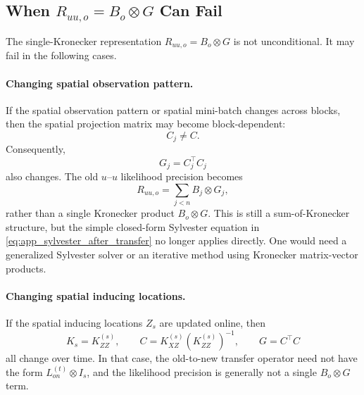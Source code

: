 \documentclass[12pt]{article}
\begin{document}
\subsection{\texorpdfstring{When \(R_{uu,o}=B_o\otimes G\) Can Fail}{When Ruu,o = Bo tensor G Can Fail}}
\label{app:failure_cases_Ro_kron}

The single-Kronecker representation \(R_{uu,o}=B_o\otimes G\) is not
unconditional. It may fail in the following cases.

\paragraph{Changing spatial observation pattern.}
If the spatial observation pattern or spatial mini-batch changes across
blocks, then the spatial projection matrix may become block-dependent:
\begin{equation}
    C_j\neq C.
\end{equation}
Consequently,
\begin{equation}
    G_j=C_j^\top C_j
\end{equation}
also changes. The old $u$--$u$ likelihood precision becomes
\begin{equation}
    R_{uu,o}
    =
    \sum_{j<n}
    B_j\otimes G_j,
\end{equation}
rather than a single Kronecker product \(B_o\otimes G\). This is still a
sum-of-Kronecker structure, but the simple closed-form Sylvester equation
in \eqref{eq:app_sylvester_after_transfer} no longer applies directly.
One would need a generalized Sylvester solver or an iterative method using
Kronecker matrix-vector products.

\paragraph{Changing spatial inducing locations.}
If the spatial inducing locations \(Z_s\) are updated online, then
\begin{equation}
    K_s=K_{ZZ}^{(s)},
    \qquad
    C=K_{XZ}^{(s)}\left(K_{ZZ}^{(s)}\right)^{-1},
    \qquad
    G=C^\top C
\end{equation}
all change over time. In that case, the old-to-new transfer operator need
not have the form \(L_{on}^{(t)}\otimes I_s\), and the likelihood
precision is generally not a single \(B_o\otimes G\) term.
\end{document}

